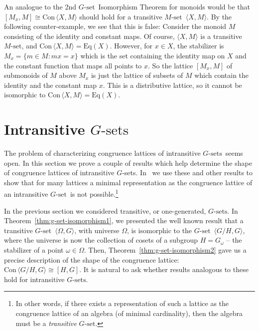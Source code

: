 \documentclass[cm,dissertation]{uhthesis}
\theoremstyle{plain}
\theoremstyle{definition}
\theoremstyle{remark}
\numberwithin{theorem}{section}
\numberwithin{claim}{chapter}
\numberwithin{equation}{section}
\numberwithin{conjecture}{chapter}
\newcommand{\<}{\ensuremath{\langle}}
\renewcommand{\>}{\ensuremath{\rangle}}
\newcommand{\Eq}{\ensuremath{\mathrm{Eq}}}
\newcommand{\Con}{\ensuremath{\mathrm{Con\,}}}
\newcommand{\0}{\ensuremath{\mathbf{0}}}
\newcommand{\1}{\ensuremath{\mathbf{1}}}
\newcommand{\2}{\ensuremath{\mathbf{2}}}
\newcommand{\3}{\ensuremath{\mathbf{3}}}
\newcommand{\4}{\ensuremath{\mathbf{4}}}
\newcommand{\5}{\ensuremath{\mathbf{5}}}
\newcommand{\Gset}{\ensuremath{G\text{-set}}}
\newcommand{\Gsets}{\ensuremath{G\text{-sets}}}
\newcommand{\Mset}{\ensuremath{M\text{-set}}}
\newcommand{\la}{\langle}	     %
\newcommand{\ra}{\rangle}	     %
\begin{document}
  An analogue to the 2nd \Gset\ Isomorphism Theorem for monoids would be that
  $[M_x, M] \cong \Con\<X, M\>$ should hold for a transitive \Mset\ $\<X, M\>$.
  By the following counter-example, we see that this is false:
  Consider the monoid $M$ consisting of the identity and constant maps.  Of
  course, $\<X, M\>$ is a transitive \Mset, and $\Con\<X, M\> =
  \Eq(X)$. However, for $x\in X$, the stabilizer is  
  $M_x = \{m \in M: mx = x\}$ which is the set containing the identity map on $X$
  and the constant function that maps all points to $x$.
  So the lattice $[M_x, M]$ of submonoids of $M$ above $M_x$ is just the lattice
  of subsets of $M$ which contain the identity and the constant map $x$.  This is a
  distributive lattice, so it cannot be isomorphic to $\Con\<X, M\> = \Eq(X)$.


\section{Intransitive \Gsets}
\label{sec:congr-latt-intr}
The problem of characterizing congruence lattices of %
intransitive \Gsets\ seems open. 
In this section we prove a couple of results
which help determine the shape of 
congruence lattices of intransitive $G$-sets. 
In~\cite{gsets} we use these and other
results to show that for many lattices a minimal representation as the
congruence lattice of an intransitive \Gset\ is not possible.\footnote{In other
  words, if there exists a representation of such a lattice as the congruence
  lattice of an algebra (of minimal cardinality), then the
  algebra must be a \emph{transitive} \Gset.}

In the previous section we considered transitive, or one-generated, \Gsets.
In Theorem~\ref{thm:g-set-isomorphism1}, we presented the well known result that
a transitive \Gset\ $\<\Omega, G\>$, with universe $\Omega$, is isomorphic to the
\Gset\ $\<G/H, G\>$, where the universe is now the collection of cosets of
a subgroup $H= G_\omega$ -- the stabilizer of a point $\omega\in \Omega$.
Then, Theorem~\ref{thm:g-set-isomorphism2} gave us a precise 
description of the shape of the congruence lattice: $\Con\<G/H, G\> \cong [H,G]$. 
It is natural to ask whether results analogous to these 
hold for intransitive \Gsets.
\end{document}
